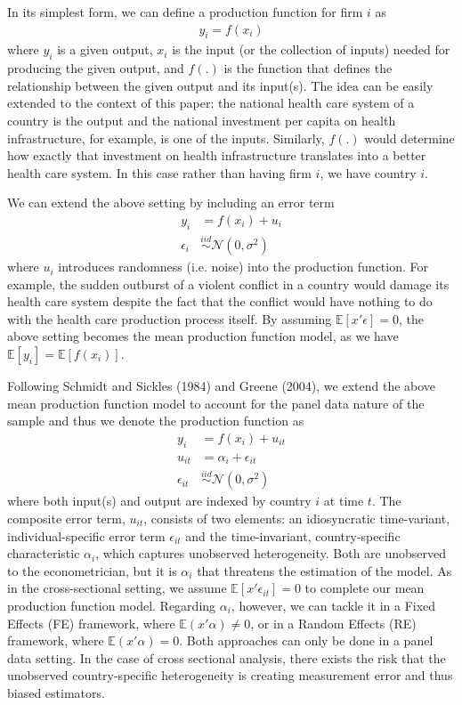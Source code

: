 \documentclass[12pt,a4paper]{article}\usepackage[]{graphicx}\usepackage[]{color}
\begin{document}
In its simplest form, we can define a production function for firm $i$ as
$$
\begin{aligned}
y_i = f(x_i)
\end{aligned}
$$
where $y_i$ is a given output, $x_i$ is the input (or the collection of inputs) needed for producing the given output, and $f(.)$ is the function that defines the relationship between the given output and its input(s). The idea can be easily extended to the context of this paper: the national health care system of a country is the output and the national investment per capita on health infrastructure, for example, is one of the inputs. Similarly, $f(.)$ would determine how exactly that investment on health infrastructure translates into a better health care system. In this case rather than having firm $i$, we have country $i$.

We can extend the above setting by including an error term
$$
\begin{aligned}
y_i & = f(x_i) + u_i \\
\epsilon_i & \overset{iid}{\sim} \mathcal{N}(0, \sigma ^2)
\end{aligned}
$$
where $u_i$ introduces randomness (i.e. noise) into the production function. For example, the sudden outburst of a violent conflict in a country would damage its health care system despite the fact that the conflict would have nothing to do with the health care production process itself. By assuming $\mathbb{E}[x'\epsilon]=0$, the above setting becomes the mean production function model, as we have $\mathbb{E}[y_i]=\mathbb{E}[f(x_i)]$.

Following Schmidt and Sickles (1984) and Greene (2004), we extend the above mean production function model to account for the panel data nature of the sample and thus we denote the production function as
$$
\begin{aligned}
y_i & = f(x_i) + u_{it} \\
u_{it} & = \alpha_i + \epsilon_{it} \\
\epsilon_{it} & \overset{iid}{\sim} \mathcal{N}(0, \sigma ^2)
\end{aligned}
$$
where both input(s) and output are indexed by country $i$ at time $t$. The composite error term, $u_{it}$, consists of two elements: an idiosyncratic time-variant, individual-specific error term $\epsilon_{it}$ and the time-invariant, country-specific characteristic $\alpha_i$, which captures unobserved heterogeneity. Both are unobserved to the econometrician, but it is $\alpha_i$ that threatens the estimation of the model. As in the cross-sectional setting, we assume $\mathbb{E}[x' \epsilon_{it}]=0$ to complete our mean production function model. Regarding $\alpha_i$, however, we can tackle it in a Fixed Effects (FE) framework, where $\mathbb{E}(x' \alpha) \neq 0$, or in a Random Effects (RE) framework, where $\mathbb{E}(x' \alpha) = 0$. Both approaches can only be done in a panel data setting. In the case of cross sectional analysis, there exists the risk that the unobserved country-specific heterogeneity is creating measurement error and thus biased estimators. 
\end{document}
